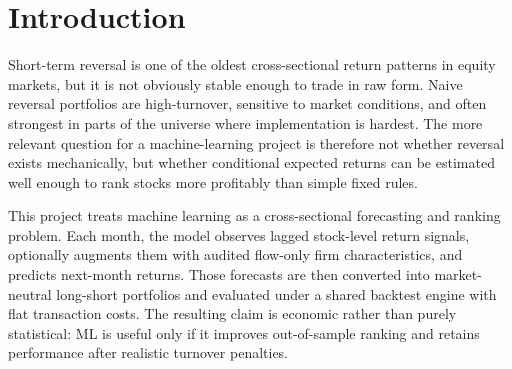 \begin{abstract}
We study whether nonlinear machine-learning models can improve next-month
cross-sectional U.S. equity return forecasts, and whether those forecasts
survive a disciplined long-short implementation after transaction costs. The
empirical design uses only course-provided Monthly CRSP and Compustat-style
data, with a final audited expanding-window walk-forward protocol
that evaluates annual out-of-sample test folds from 2017 through 2024. The
main specification combines return features with an audited flow-only
Compustat block and maps monthly predictions into equal-weight top-minus-bottom
decile portfolios. The strongest result is the flow-Compustat MLP,
which delivers net Sharpe 2.03 at 10 bps, annualized net return 21.4\%, a
rank-IC HAC $t$-statistic of 6.36, and breakeven costs near 90 bps. The
strategy strongly outperforms same-protocol reversal and z-score reversal
benchmarks. Momentum remains the strongest classical comparator; the ML
strategies are economically stronger, but mean-difference tests versus
momentum are not strongly significant. Performance is higher in bear and
high-volatility states, yet direct regime-feature ablations do not improve the
strong flow-Compustat models. The central limitation is that the provided
Monthly CRSP extract omits , , , and
, so the report supports a credible flat-cost academic result
rather than a full tradability proof.
\end{abstract}

\section{Introduction}

Short-term reversal is one of the oldest cross-sectional return patterns in
equity markets, but it is not obviously stable enough to trade in raw form.
Naive reversal portfolios are high-turnover, sensitive to market conditions,
and often strongest in parts of the universe where implementation is hardest.
The more relevant question for a machine-learning project is therefore not
whether reversal exists mechanically, but whether conditional expected returns
can be estimated well enough to rank stocks more profitably than simple fixed
rules.

This project treats machine learning as a cross-sectional forecasting and
ranking problem. Each month, the model observes lagged stock-level return
signals, optionally augments them with audited flow-only firm
characteristics, and predicts next-month returns. Those forecasts are then
converted into market-neutral long-short portfolios and evaluated under a
shared backtest engine with flat transaction costs. The resulting claim is
economic rather than purely statistical: ML is useful only if it improves
out-of-sample ranking and retains performance after realistic turnover
penalties.


